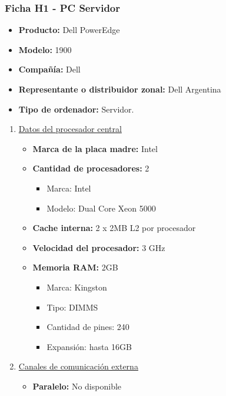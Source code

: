 \subsubsection{Ficha H1 - PC Servidor}
\begin{itemize}
  \item \textbf{Producto:} Dell PowerEdge\texttrademark
  \item \textbf{Modelo:} 1900
  \item \textbf{Compañía:} Dell
  \item \textbf{Representante o distribuidor zonal:} Dell Argentina
  \item \textbf{Tipo de ordenador:} Servidor.
\end{itemize}

\begin{enumerate}

  \item \underline{Datos del procesador central}
  \begin{itemize}
    \item \textbf{Marca de la placa madre:} Intel
    
    \item \textbf{Cantidad de procesadores:} 2
    \begin{itemize}
      \item Marca: Intel
      \item Modelo: Dual Core Xeon 5000
    \end{itemize}
    
    \item \textbf{Cache interna:} 2 x 2MB L2 por procesador
    \item \textbf{Velocidad del procesador:} 3 GHz
    \item \textbf{Memoria RAM:} 2GB
    
    \begin{itemize}
      \item Marca: Kingston
      \item Tipo: DIMMS
      \item Cantidad de pines: 240
      \item Expansión: hasta 16GB
    \end{itemize}
  \end{itemize}
  
  
  \item \underline{Canales de comunicación externa}
  \begin{itemize}
    \item \textbf{Paralelo:} No disponible
    

\end{itemize}
\end{enumerate}
